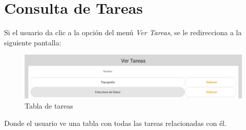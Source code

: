 \section{Consulta de Tareas}
    Si el usuario da clic a la opción del menú \textit{Ver Tareas}, se le redirecciona a la siguiente pantalla:
        \begin{figure}[H]
            \centering
            \hypertarget{asignart}{\includegraphics[width=0.7\linewidth]{images/Tareas/Vertareas}}
            \caption{Tabla de tareas}
            \label{asignart}
        \end{figure}
    Donde el usuario ve una tabla con todas las tareas relacionadas con él.
